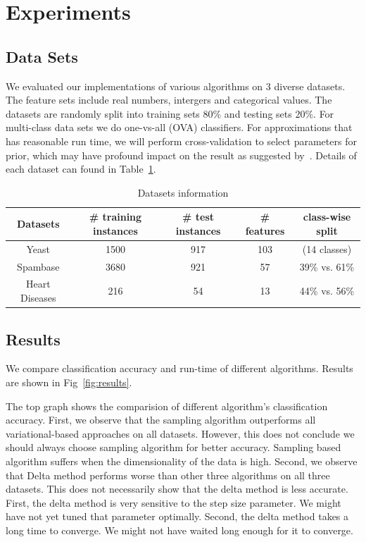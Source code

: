 \section{Experiments}
\label{sec:experiments}

\subsection{Data Sets}

We evaluated our implementations of various algorithms on 3 diverse datasets. The feature sets include real numbers, intergers and categorical values. The datasets are randomly split into training sets $80\%$ and
testing sets $20\%$. For multi-class data sets we do one-vs-all (OVA)
classifiers. For approximations that has reasonable run time, we will perform
cross-validation to select parameters for prior, which may have profound
impact on the result as suggested by~\cite{Asuncion2009smoothing}. Details of each dataset can found in Table~\ref{tb:datasets}.

\begin{table}
\begin{tabular}{| c | c |  c | c | c |}
  \hline
  Datasets & \# training instances & \# test instances & \# features & class-wise split\\
  \hline
  Yeast & 1500 & 917 & 103 & (14 classes) \\
  \hline
  Spambase & 3680 & 921 & 57 & 39\% vs. 61\% \\
  \hline
  Heart Diseases & 216 & 54 & 13 & 44\% vs. 56\% \\
  \hline
\end{tabular}

\caption{Datasets information}
\label{tb:datasets}
\end{table}

\subsection{Results}

We compare classification accuracy and run-time of different algorithms. Results are shown in Fig~\ref{fig:results}.

The top graph shows the comparision of different algorithm's classification accuracy. First, we observe that the sampling algorithm outperforms all variational-based approaches on all datasets. However, this does not conclude we should always choose sampling algorithm for better accuracy. Sampling based algorithm suffers when the dimensionality of the data is high. Second, we observe that Delta method performs worse than other three algorithms on all three datasets. This does not necessarily show that the delta method is less accurate. First, the delta method is very sensitive to the step size parameter. We might have not yet tuned that parameter optimally. Second, the delta method takes a long time to converge. We might not have waited long enough for it to converge.

